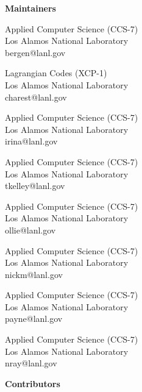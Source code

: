\begin{multicols}{2}
{\huge \textbf{Maintainers}}

\vspace{0.25cm}

{Applied Computer Science (CCS-7)\\
Los Alamos National Laboratory\\
bergen@lanl.gov}

{Lagrangian Codes (XCP-1)\\
Los Alamos National Laboratory\\
charest@lanl.gov}

{Applied Computer Science (CCS-7)\\
Los Alamos National Laboratory\\
irina@lanl.gov}

{Applied Computer Science (CCS-7)\\
Los Alamos National Laboratory\\
tkelley@lanl.gov}

{Applied Computer Science (CCS-7)\\
Los Alamos National Laboratory\\
ollie@lanl.gov}

{Applied Computer Science (CCS-7)\\
Los Alamos National Laboratory\\
nickm@lanl.gov}

{Applied Computer Science (CCS-7)\\
Los Alamos National Laboratory\\
payne@lanl.gov}

{Applied Computer Science (CCS-7)\\
Los Alamos National Laboratory\\
nray@lanl.gov}

\vfill
\columnbreak

{\huge \textbf{Contributors}}

\vspace{0.25cm}


\vfill
\end{multicols}

\pagebreak

